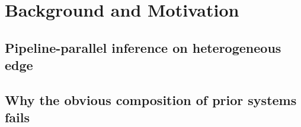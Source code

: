 \section{Background and Motivation}\label{sec:background}

\subsection{Pipeline-parallel inference on heterogeneous edge}\label{sec:bg:pipeline}

\subsection{Why the obvious composition of prior systems fails}\label{sec:bg:gap}
